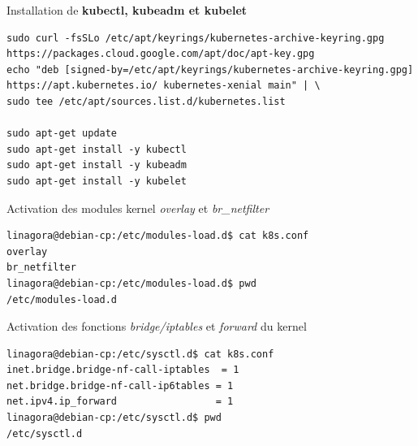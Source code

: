 \begin{frame}[shrink=7,fragile]{Installation de \textbf{kubectl, kubeadm et kubelet}}

\begin{tiny}
\begin{Verbatim}[commandchars=\&\#\#]
sudo curl -fsSLo /etc/apt/keyrings/kubernetes-archive-keyring.gpg https://packages.cloud.google.com/apt/doc/apt-key.gpg
echo "deb [signed-by=/etc/apt/keyrings/kubernetes-archive-keyring.gpg] https://apt.kubernetes.io/ kubernetes-xenial main" | \
sudo tee /etc/apt/sources.list.d/kubernetes.list

sudo apt-get update
sudo apt-get install -y kubectl
sudo apt-get install -y kubeadm
sudo apt-get install -y kubelet
\end{Verbatim}
\end{tiny}

\end{frame}


\begin{frame}[fragile]{Activation des modules kernel \textit{overlay} et \textit{br\_netfilter}}

\begin{tiny}
\begin{Verbatim}[commandchars=\&\#\#]
linagora@debian-cp:/etc/modules-load.d$ cat k8s.conf 
overlay
br_netfilter
linagora@debian-cp:/etc/modules-load.d$ pwd
/etc/modules-load.d
\end{Verbatim}
\end{tiny}

\end{frame}


\begin{frame}[fragile]{Activation des fonctions \textit{bridge/iptables} et \textit{forward} du kernel}

\begin{tiny}
\begin{Verbatim}[commandchars=\&\#\#]
linagora@debian-cp:/etc/sysctl.d$ cat k8s.conf 
inet.bridge.bridge-nf-call-iptables  = 1
net.bridge.bridge-nf-call-ip6tables = 1
net.ipv4.ip_forward                 = 1
linagora@debian-cp:/etc/sysctl.d$ pwd
/etc/sysctl.d
\end{Verbatim}
\end{tiny}

\end{frame}

